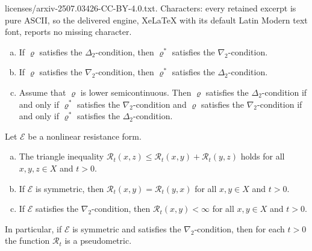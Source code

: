 \documentclass[10pt,a4paper]{amsart}
\newcommand{\cE}{{\mathcal E}}
\newcommand{\cR}{{\mathcal R}}
\newcommand{\vr}{{\varrho}}
\begin{document}
licenses/arxiv-2507.03426-CC-BY-4.0.txt. Characters: every retained excerpt is pure ASCII, so the delivered engine, XeLaTeX with its default Latin Modern text font, reports no missing character.
 \begin{lemma}\label{lemma:duality delta and nabla}
 \begin{enumerate}[(a)]
  \item   If $\vr$ satisfies the $\Delta_2$-condition, then $\vr^*$ satisfies the $\nabla_2$-condition.  
  \item If $\vr$ satisfies the $\nabla_2$-condition, then $\vr^*$ satisfies the $\Delta_2$-condition. 
  \item Assume that $\vr$ is lower semicontinuous. Then  $\vr$ satisfies the $\Delta_2$-condition if and only if $\vr^*$ satisfies the $\nabla_2$-condition and $\vr$ satisfies the $\nabla_2$-condition if and only if $\vr^*$ satisfies the $\Delta_2$-condition. 
 \end{enumerate}

 \end{lemma}

\begin{theorem}\label{theorem:triangle inequality}
Let $\cE$ be a nonlinear resistance form.  
\begin{enumerate}[(a)]
 \item The triangle inequality $\cR_t(x,z) \leq \cR_t(x,y) + \cR_t(y,z)$ holds for all $x,y,z \in X$ and $t > 0$. 
 \item If $\cE$ is symmetric, then  $\cR_t(x,y) = \cR_t(y,x)$ for all $x,y \in X$ and $t > 0$.
 \item If $\cE$ satisfies the $\nabla_2$-condition, then $\cR_t(x,y) < \infty$ for all $x,y \in X$ and $t> 0$.
\end{enumerate}
In particular, if $\cE$ is symmetric and satisfies the $\nabla_2$-condition, then for each $t > 0$ the function $\cR_t$ is a pseudometric. 
\end{theorem}
\end{document}

